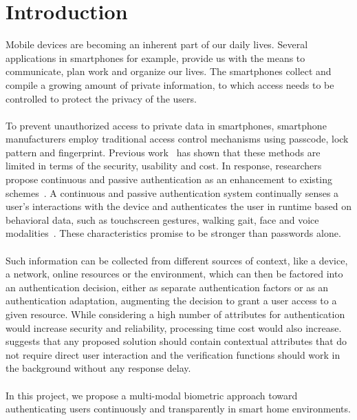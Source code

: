 \documentclass[a4paper, 11pt]{article}
\begin{document}
\section*{Introduction}
Mobile devices are becoming an inherent part of our daily lives. Several applications in smartphones for example, provide us with the means to communicate, plan work and organize our lives. The smartphones collect and compile a growing amount of private information, to which access needs to be controlled to protect the privacy of the users. \\\\
\noindent
To prevent unauthorized access to private data in smartphones, smartphone manufacturers employ traditional access control mechanisms using passcode, lock pattern and fingerprint. Previous work~\cite{} has shown that these methods are limited in terms of the security, usability and cost. In response, researchers propose continuous and passive authentication as an enhancement to existing schemes~\cite{}. A continuous and passive authentication system continually senses a user’s interactions with the device and authenticates the user in runtime based on behavioral data, such as touchscreen gestures, walking gait, face and voice modalities~\cite{}. These characteristics promise to be stronger than passwords alone.\\\\
\noindent
Such information can be collected from different sources of context, like a device, a network, online resources or the environment, which can then be factored into an authentication decision, either as separate authentication factors or as an authentication adaptation, augmenting the decision to grant a user access to a given resource. While considering a high number of attributes for authentication would increase security and reliability, processing time cost would also increase. \cite{}suggests that any proposed solution should contain contextual attributes that do not require direct user interaction and the verification functions should work in the background without any response delay. \\\\
\noindent
In this project, we propose a multi-modal biometric approach toward authenticating users continuously and transparently in smart home environments.
\end{document}
